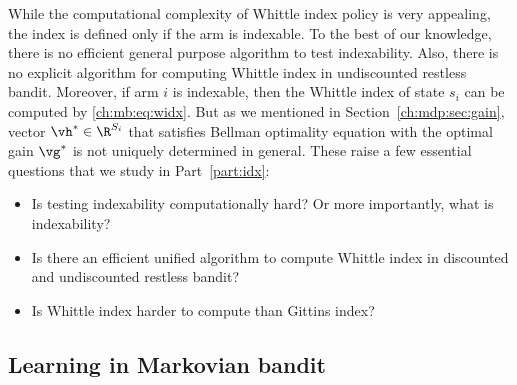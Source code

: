 While the computational complexity of Whittle index policy is very appealing, the index is defined only if the arm is indexable.
To the best of our knowledge, there is no efficient general purpose algorithm to test indexability.
Also, there is no explicit algorithm for computing Whittle index in undiscounted restless bandit.
Moreover, if arm $i$ is indexable, then the Whittle index of state $s_i$ can be computed by \eqref{ch:mb:eq:widx}. %
But as we mentioned in Section~\ref{ch:mdp:sec:gain}, vector $\vh^*\in\R^{S_i}$ that satisfies Bellman optimality equation with the optimal gain $\vg^*$ is not uniquely determined in general.
These raise a few essential questions that we study in Part~\ref{part:idx}:
\begin{itemize}
    \item Is testing indexability computationally hard? Or more importantly, what is indexability?
    \item Is there an efficient unified algorithm to compute Whittle index in discounted and undiscounted restless bandit?
    \item Is Whittle index harder to compute than Gittins index?
\end{itemize}


\subsection{Learning in Markovian bandit}

\endgroup
